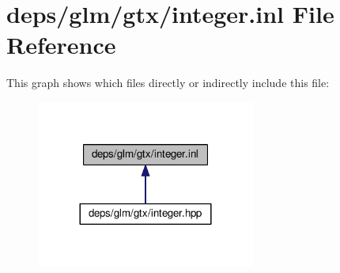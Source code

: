 \hypertarget{gtx_2integer_8inl}{}\section{deps/glm/gtx/integer.inl File Reference}
\label{gtx_2integer_8inl}
This graph shows which files directly or indirectly include this file\+:
\nopagebreak
\begin{figure}[H]
\begin{center}
\leavevmode
\includegraphics[width=204pt]{dc/d20/gtx_2integer_8inl__dep__incl}
\end{center}
\end{figure}
